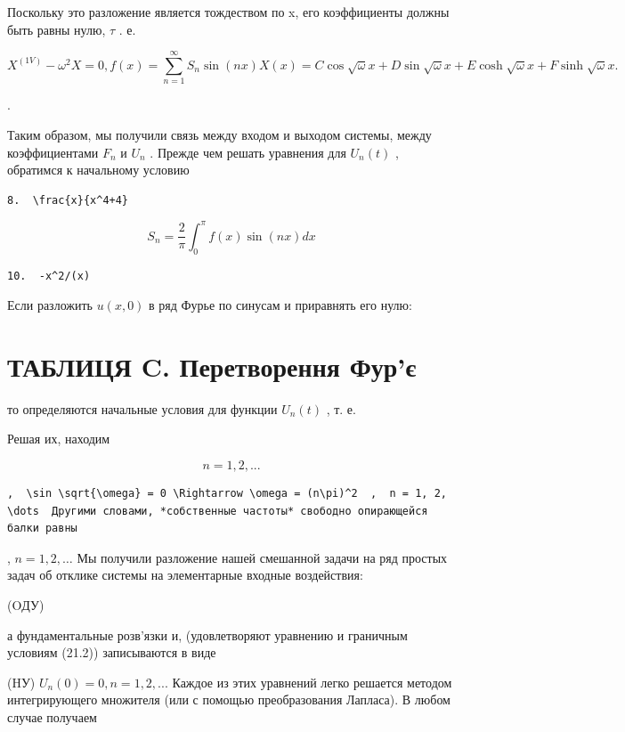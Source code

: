 \documentclass[
  ukrainian,
]{article}
\begin{document}
Поскольку это разложение является тождеством по x, его коэффициенты
должны быть равны нулю, \(\tau\) . е.

\[
X^{(1V)} - \omega^2 X = 0,
f(x) = \sum_{n=1}^{\infty} S_n \sin(nx)
X(x) = C\cos\sqrt{\omega}x + D\sin\sqrt{\omega}x + E \cosh\sqrt{\omega}x + F \sinh\sqrt{\omega}x.
\]

.

Таким образом, мы получили связь между входом и выходом системы, между
коэффициентами \(F_n\) и \(U_n\) . Прежде чем решать уравнения для
\(U_n(t)\) , обратимся к начальному условию

\begin{verbatim}
8.  \frac{x}{x^4+4} 
\end{verbatim}

\[
S_n = \frac{2}{\pi} \int_{0}^{\pi} f(x) \sin(nx) dx
\]

\begin{verbatim}
10.  -x^2/(x) 
\end{verbatim}

Если разложить \(u(x, 0)\) в ряд Фурье по синусам и приравнять его нулю:

\section{ТАБЛИЦЯ C. Перетворення
Фур'є}\label{ux442ux430ux431ux43bux438ux446ux44f-c.-ux43fux435ux440ux435ux442ux432ux43eux440ux435ux43dux43dux44f-ux444ux443ux440ux454}

то определяются начальные условия для функции \(U_n\left(t\right)\) , т.
е.

Решая их, находим

\[
n = 1, 2, ...
\]

\begin{verbatim}
,  \sin \sqrt{\omega} = 0 \Rightarrow \omega = (n\pi)^2  ,  n = 1, 2, \dots  Другими словами, *собственные частоты* свободно опирающейся балки равны
\end{verbatim}

, \(n = 1, 2, \dots\) Мы получили разложение нашей смешанной задачи на
ряд простых задач об отклике системы на элементарные входные
воздействия:

(OДУ)

а фундаментальные розв'язки и, (удовлетворяют уравнению и граничным
условиям (21.2)) записываются в виде

(HУ) \(U_n(0) = 0, n = 1, 2, ...\) Каждое из этих уравнений легко
решается методом интегрирующего множителя (или с помощью преобразования
Лапласа). В любом случае получаем
\end{document}
